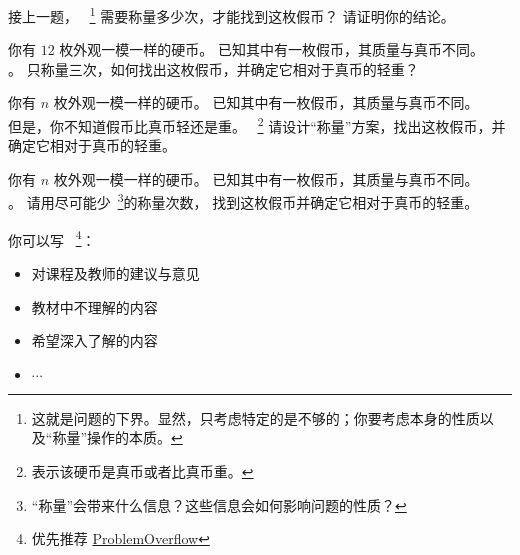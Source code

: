 \documentclass[a4paper, justified]{tufte-handout}
\begin{document}
\begin{solution}
\end{solution}

\begin{problem}[$n$ 枚硬币问题的下界]
  接上一题，
  ~\footnote{这就是问题的下界。显然，只考虑特定的是不够的；你要考虑本身的性质以及``称量''操作的本质。}
  需要称量多少次，才能找到这枚假币？
  请证明你的结论。
\end{problem}

\begin{solution}
\end{solution}

\begin{problem}
  你有 $12$ 枚外观一模一样的硬币。
  已知其中有一枚假币，其质量与真币不同。\\
  。
  只称量三次，如何找出这枚假币，并确定它相对于真币的轻重？

\end{problem}

\begin{solution}%
\end{solution}

\beginoptional
\begin{problem}[$n$ 枚硬币]
  你有 $n$ 枚外观一模一样的硬币。
  已知其中有一枚假币，其质量与真币不同。\\
  但是，你不知道假币比真币轻还是重。
  ~\footnote{表示该硬币是真币或者比真币重。} 
  请设计``称量''方案，找出这枚假币，并确定它相对于真币的轻重。
\end{problem}

\begin{solution}
\end{solution}
\begin{problem}[\ot{} $n$ 枚硬币]
  你有 $n$ 枚外观一模一样的硬币。
  已知其中有一枚假币，其质量与真币不同。\\
  。
  请用尽可能少~\footnote{``称量''会带来什么信息？这些信息会如何影响问题的性质？}的称量次数，
  找到这枚假币并确定它相对于真币的轻重。
\end{problem}

\begin{solution}
\end{solution}
\beginfb

你可以写
~\footnote{优先推荐 \href{http://39.100.120.199}{ProblemOverflow}}：
\begin{itemize}
  \item 对课程及教师的建议与意见
  \item 教材中不理解的内容
  \item 希望深入了解的内容
  \item $\cdots$
\end{itemize}
\end{document}
